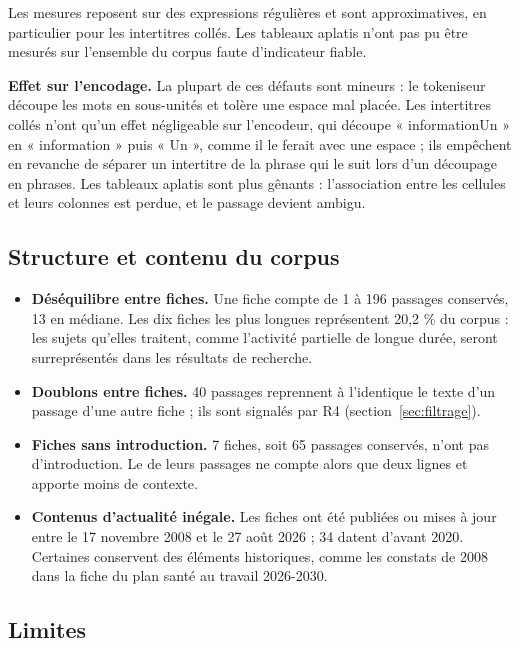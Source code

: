 Les mesures reposent sur des expressions régulières et sont approximatives, en particulier pour les
intertitres collés. Les tableaux aplatis n'ont pas pu être mesurés sur l'ensemble du corpus faute
d'indicateur fiable.

\textbf{Effet sur l'encodage.} La plupart de ces défauts sont mineurs : le tokeniseur découpe les mots
en sous-unités et tolère une espace mal placée. Les intertitres collés n'ont qu'un effet négligeable sur
l'encodeur, qui découpe « informationUn » en « information » puis « Un », comme il le ferait avec une
espace ; ils empêchent en revanche de séparer un intertitre de la phrase qui le suit lors d'un découpage
en phrases. Les tableaux aplatis sont plus gênants : l'association entre les cellules et leurs colonnes
est perdue, et le passage devient ambigu.

\subsection{Structure et contenu du corpus}

\begin{itemize}
\item \textbf{Déséquilibre entre fiches.} Une fiche compte de 1 à 196 passages conservés, 13 en médiane.
Les dix fiches les plus longues représentent 20,2 \% du corpus : les sujets qu'elles traitent, comme
l'activité partielle de longue durée, seront surreprésentés dans les résultats de recherche.
\item \textbf{Doublons entre fiches.} 40 passages reprennent à l'identique le texte d'un passage d'une
autre fiche ; ils sont signalés par R4 (section~\ref{sec:filtrage}).
\item \textbf{Fiches sans introduction.} 7 fiches, soit 65 passages conservés, n'ont pas d'introduction.
Le  de leurs passages ne compte alors que deux lignes et apporte moins de contexte.
\item \textbf{Contenus d'actualité inégale.} Les fiches ont été publiées ou mises à jour entre le
17 novembre 2008 et le 27 août 2026 ; 34 datent d'avant 2020. Certaines conservent des éléments
historiques, comme les constats de 2008 dans la fiche du plan santé au travail 2026-2030.
\end{itemize}

\subsection{Limites}\label{sec:limites}

